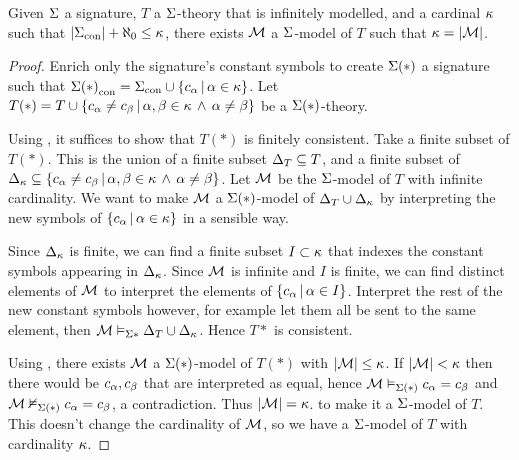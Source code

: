 \begin{prop}
    Given $\Sigma$ a signature, 
    $T$ a $\Sigma$-theory that is infinitely modelled,
    and a cardinal $\kappa$ such that $|{\Sigma}_\mathrm{con}| + \aleph_0 \leq \kappa$, 
    there exists $\mathcal{M}$ a $\Sigma$-model of $T$ such that 
    $\kappa = |{\mathcal{M}}|$.
\end{prop}
\begin{proof}
    Enrich only the signature's constant symbols to create $\Sigma(*)$ 
    a signature such that 
    ${\Sigma(*)}_\mathrm{con} = {\Sigma}_\mathrm{con} \cup \left\{c_\alpha \,|\, \alpha \in \kappa\right\}$.
    Let $T(*) = T \cup \left\{c_\alpha \neq c_\beta \,|\, \alpha,\beta \in \kappa \, \land \, \alpha \ne \beta\right\}$
    be a $\Sigma(*)$-theory.
    
    Using , 
    it suffices to show that $T(*)$ is finitely consistent.
    Take a finite subset of $T(*)$. 
    This is the union of a finite subset $\Delta_T \subseteq T$, 
    and a finite subset of 
    $\Delta_{\kappa} \subseteq 
    \left\{c_\alpha \neq c_\beta \,|\, \alpha,\beta \in \kappa \, \land \, \alpha \ne \beta\right\}$.
    Let $\mathcal{M}$ be the $\Sigma$-model of $T$ with infinite cardinality.
    We want to make 
    $\mathcal{M}$ a ${\Sigma(*)}$-model of $\Delta_T \cup \Delta_\kappa$ 
    by interpreting the new symbols of $\left\{c_\alpha \,|\, \alpha \in \kappa\right\}$
    in a sensible way.
    
    Since $\Delta_\kappa$ is finite, 
    we can find a finite subset $I \subset \kappa$ 
    that indexes the constant symbols appearing in $\Delta_\kappa$. 
    Since $\mathcal{M}$ is infinite and $I$ is finite,
    we can find distinct elements of $\mathcal{M}$
    to interpret the elements of
    $\left\{c_\alpha \,|\, \alpha \in I\right\}$. 
    Interpret the rest of the new constant symbols however,
    for example let them all be sent to the same element,
    then $\mathcal{M} \vDash_{\Sigma*} \Delta_T \cup \Delta_\kappa$.
    Hence $T*$ is consistent.
    
    Using 
    ,
    there exists
    $\mathcal{M}$ a $\Sigma(*)$-model of $T(*)$ with $|{\mathcal{M}}|\leq \kappa$.
    If $|{\mathcal{M}}| < \kappa$ 
    then there would be $c_\alpha, c_\beta$ that are interpreted as equal,
    hence $\mathcal{M} \vDash_{\Sigma(*)} c_\alpha = c_\beta$ and $\mathcal{M} \nvDash_{\Sigma(*)} c_\alpha = c_\beta$, 
    a contradiction.
    Thus $|{\mathcal{M}}| = \kappa$.
    to make it a $\Sigma$-model of $T$.
    This doesn't change the cardinality of $\mathcal{M}$,
    so we have a $\Sigma$-model of $T$ with cardinality $\kappa$.
\end{proof}

